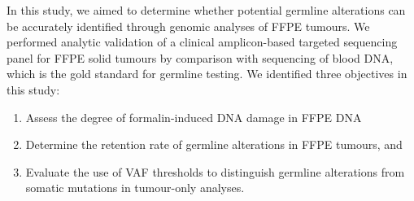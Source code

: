 In this study, we aimed to determine whether potential germline alterations can be accurately identified through genomic analyses of FFPE tumours. We performed analytic validation of a clinical amplicon-based targeted sequencing panel for FFPE solid tumours by comparison with sequencing of blood DNA, which is the gold standard for germline testing. We identified three objectives in this study:

\begin{enumerate}
\item Assess the degree of formalin-induced DNA damage in FFPE DNA
\item Determine the retention rate of germline alterations in FFPE tumours, and
\item Evaluate the use of VAF thresholds to distinguish germline alterations from somatic mutations in tumour-only analyses.
\end{enumerate}


\endinput


Both von Hansemann and Boveri observed unequal chromosomal segregations in tumour cells, which prompted their speculations that tumour development is induced by anomalies in hereditary material \cite{VonHansemann1890, Boveri1914}. An observation that drew Boveri's attention is that not all chromosomal imbalanced cells proliferated uncontrollably and formed tumours, there were some that resulted in cell death. This led Boveri to further hypothesize that genetic materials are functionally different, and tumour formation is promoted by retention of chromatin parts that stimulate growth or elimination of those that inhibit growth, concepts that manifested in the present knowledge of oncogenes and tumour-suppressor genes, respectively \cite{Boveri1914}.

